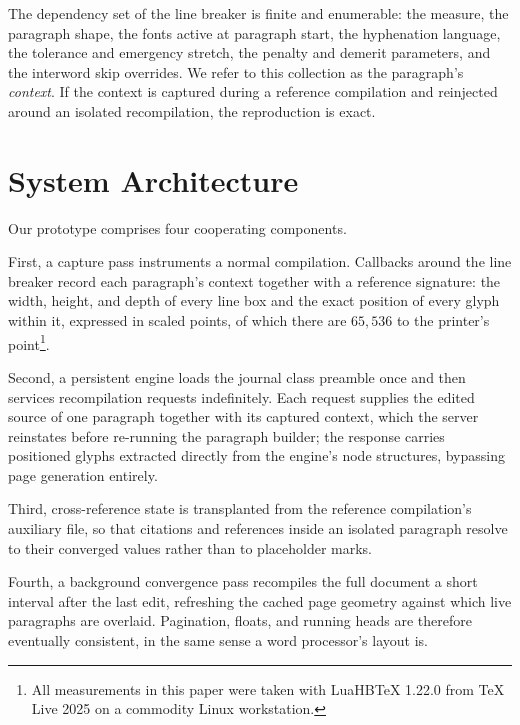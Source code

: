 \documentclass[journal]{IEEEtran}
\begin{document}
\tagStructPara{}The dependency set of the line breaker is finite and enumerable: the
measure, the paragraph shape, the fonts active at paragraph start, the
hyphenation language, the tolerance and emergency stretch, the penalty and
demerit parameters, and the interword skip overrides. We refer to this
collection as the paragraph's \emph{context}. If the context is captured
during a reference compilation and reinjected around an isolated
recompilation, the reproduction is exact.\tagStructParaEnd{}%

\section{System Architecture}

\tagStructPara{}Our prototype comprises four cooperating components.\tagStructParaEnd{}%

\tagStructPara{}First, a capture pass instruments a normal compilation. Callbacks around
the line breaker record each paragraph's context together with a reference
signature: the width, height, and depth of every line box and the exact
position of every glyph within it, expressed in scaled points, of which
there are $65{,}536$ to the printer's point\footnote{All measurements in
this paper were taken with LuaHBTeX 1.22.0 from \TeX{} Live 2025 on a
commodity Linux workstation.}.\tagStructParaEnd{}%

\tagStructPara{}Second, a persistent engine loads the journal class preamble once and then
services recompilation requests indefinitely. Each request supplies the
edited source of one paragraph together with its captured context, which
the server reinstates before re-running the paragraph builder; the
response carries positioned glyphs extracted directly from the engine's
node structures, bypassing page generation entirely.\tagStructParaEnd{}%

\tagStructPara{}Third, cross-reference state is transplanted from the reference
compilation's auxiliary file, so that citations and references inside an
isolated paragraph resolve to their converged values rather than to
placeholder marks.\tagStructParaEnd{}%

\tagStructPara{}Fourth, a background convergence pass recompiles the full document a short
interval after the last edit, refreshing the cached page geometry against
which live paragraphs are overlaid. Pagination, floats, and running heads
are therefore eventually consistent, in the same sense a word processor's
layout is.\tagStructParaEnd{}%
\end{document}
